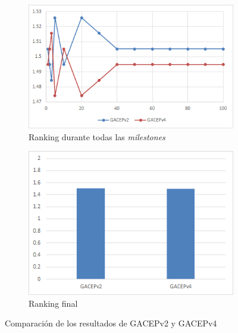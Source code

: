 \begin{figure}[h]
     \centering
     \begin{subfigure}[b]{0.45\textwidth}
         \centering
         \includegraphics[width=\textwidth]{imagenes/Experimental/GACEPv2vsGACEPv4.png}
         \caption{Ranking durante todas las \textit{milestones}}
         \label{fig:GACEPv2vsGACEPv4_lineas}
     \end{subfigure}
     \hfill
     \begin{subfigure}[b]{0.45\textwidth}
         \centering
         \includegraphics[width=\textwidth]{imagenes/Experimental/barras/GACEPv2vsGACEPv4.png}
         \caption{Ranking final}
         \label{fig:GACEPv2vsGACEPv4_barras}
     \end{subfigure}
        \caption{Comparación de los resultados de GACEPv2 y GACEPv4}
        \label{fig:GACEPv2vsGACEPv4}
\end{figure}

